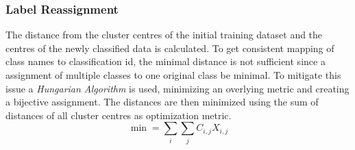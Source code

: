 \documentclass[12pt,a4paper, english,twoside]{article}
\begin{document}
    \subsubsection{Label Reassignment}
    The distance from the cluster centres of the initial training dataset and the centres of the newly classified data is calculated. 
    To get consistent mapping of class names to classification id, the minimal distance is not sufficient since a assignment of multiple classes to one original class be minimal. 
    To mitigate this issue a \textit{Hungarian Algorithm} is used, minimizing an overlying metric and creating a bijective assignment. 
    The distances are then minimized using the sum of distances of all cluster centres as optimization metric.
      \begin{equation}
        \min = \sum_{i}\sum_{j} C_{i,j}X_{i,j}
      \end{equation}
\end{document}

